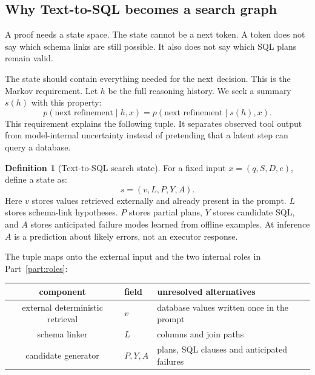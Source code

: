 \documentclass[11pt]{article}
\theoremstyle{definition}
\newtheorem{definition}[theorem]{Definition}
\begin{document}
\begin{center}
\end{center}

\subsection{Why Text-to-SQL becomes a search graph}

A proof needs a state space. The state cannot be a next token. A token does not say which schema links are still possible. It also does not say which SQL plans remain valid.

The state should contain everything needed for the next decision. This is the Markov requirement. Let $h$ be the full reasoning history. We seek a summary $s(h)$ with this property:
\[
p(\text{next refinement}\mid h,x)
=p(\text{next refinement}\mid s(h),x).
\tag{3.6}
\]
This requirement explains the following tuple. It separates observed tool output from model-internal uncertainty instead of pretending that a latent step can query a database.

\begin{definition}[Text-to-SQL search state]
For a fixed input $x=(q,S,D,e)$, define a state as:
\[
s=(v,L,P,Y,A).
\tag{3.7}
\]
Here $v$ stores values retrieved externally and already present in the prompt. $L$ stores schema-link hypotheses. $P$ stores partial plans, $Y$ stores candidate SQL, and $A$ stores anticipated failure modes learned from offline examples. At inference $A$ is a prediction about likely errors, not an executor response.
\end{definition}

The tuple maps onto the external input and the two internal roles in Part~\ref{part:roles}:

\begin{center}
\begin{tabular}{cll}
\toprule
component & field & unresolved alternatives \\
\midrule
external deterministic retrieval & $v$ & database values written once in the prompt \\
schema linker & $L$ & columns and join paths \\
candidate generator & $P,Y,A$ & plans, SQL clauses and anticipated failures \\
\bottomrule
\end{tabular}
\end{center}
\end{document}
